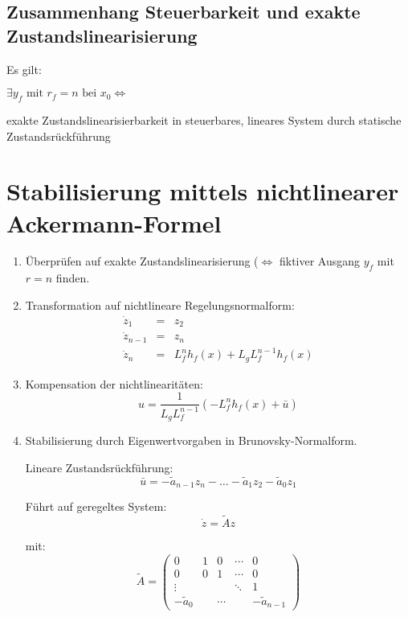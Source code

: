 \subsection{Zusammenhang Steuerbarkeit und exakte Zustandslinearisierung}
Es gilt: 

$\exists y_f \text{ mit } r_f = n \text{ bei } x_0 \Leftrightarrow$

exakte Zustandslinearisierbarkeit in steuerbares, lineares System durch statische 
Zustandsrückführung

\section{Stabilisierung mittels nichtlinearer Ackermann-Formel}
\begin{enumerate}
    \item
        Überprüfen auf exakte Zustandslinearisierung ($\Leftrightarrow$
        fiktiver Ausgang $y_f$ mit $r=n$ finden.
    \item
        Transformation auf nichtlineare Regelungsnormalform:
        \begin{eqnarray}
            \dot{z}_1 &=& z_2 \\
            \dot{z}_{n-1} &=& z_n \\
            \dot{z}_n &=& L_f^n h_f(x) + L_g L_f^{n-1} h_f(x)
        \end{eqnarray}
    \item
        Kompensation der nichtlinearitäten:
        \begin{equation}
            u = \frac{1}{L_g L_f^{n-1}} (-L_f^n h_f(x) + \bar{u})
        \end{equation}
    \item
        Stabilisierung durch Eigenwertvorgaben in Brunovsky-Normalform.
        
        Lineare Zustandsrückführung:
        \begin{equation}
            \bar{u} = -\tilde{a}_{n-1} z_n - \ldots - \tilde{a}_1 z_2 - \tilde{a}_0 z_1
        \end{equation}

        Führt auf geregeltes System:
        \begin{equation}
            \dot{z} = \tilde{A} z
        \end{equation}

        mit:
        \begin{equation}
            \tilde{A} =
                \begin{pmatrix}
                    0 & 1 & 0 & \cdots & 0 \\
                    0 & 0 & 1 & \cdots & 0 \\
                    \vdots & & & \ddots & 1 \\
                    -\tilde{a}_0 & & \cdots & & -\tilde{a}_{n-1}
                \end{pmatrix}
        \end{equation}


\end{enumerate}
